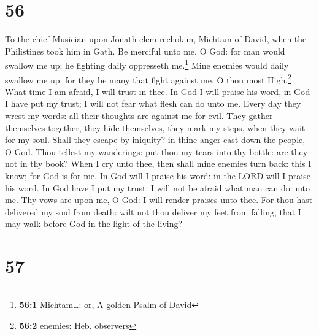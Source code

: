 \hypertarget{section-55}{%
\section{56}\label{section-55}}

To the chief Musician upon Jonath-elem-rechokim, Michtam of David, when
the Philistines took him in Gath.  Be merciful unto me, O
God: for man would swallow me up; he fighting daily oppresseth
me.\footnote{\textbf{56:1} Michtam\ldots: or, A golden Psalm of David}
 Mine enemies would daily swallow me up: for they be many
that fight against me, O thou most High.\footnote{\textbf{56:2} enemies:
  Heb. observers}  What time I am afraid, I will trust in
thee.  In God I will praise his word, in God I have put my
trust; I will not fear what flesh can do unto me.  Every
day they wrest my words: all their thoughts are against me for evil.
 They gather themselves together, they hide themselves,
they mark my steps, when they wait for my soul.  Shall
they escape by iniquity? in thine anger cast down the people, O God.
 Thou tellest my wanderings: put thou my tears into thy
bottle: are they not in thy book?  When I cry unto thee,
then shall mine enemies turn back: this I know; for God is for me.
 In God will I praise his word: in the LORD will I praise
his word.  In God have I put my trust: I will not be
afraid what man can do unto me.  Thy vows are upon me, O
God: I will render praises unto thee.  For thou hast
delivered my soul from death: wilt not thou deliver my feet from
falling, that I may walk before God in the light of the living?

\hypertarget{section-56}{%
\section{57}\label{section-56}}


